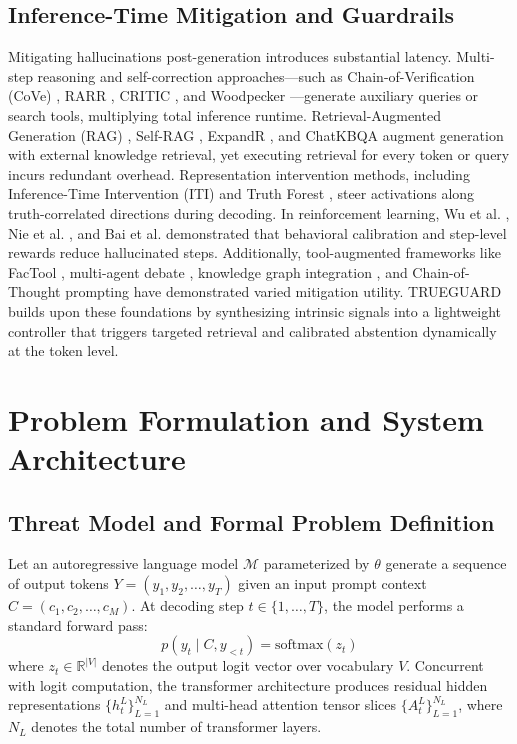 \documentclass[journal]{IEEEtran}
\begin{document}
\subsection{Inference-Time Mitigation and Guardrails}
Mitigating hallucinations post-generation introduces substantial latency. Multi-step reasoning and self-correction approaches---such as Chain-of-Verification (CoVe) \cite{dhuliawala2024chain}, RARR \cite{gao2023rarr}, CRITIC \cite{gou2023critic}, and Woodpecker \cite{yin2024woodpecker}---generate auxiliary queries or search tools, multiplying total inference runtime. Retrieval-Augmented Generation (RAG) \cite{lewis2020retrieval}, Self-RAG \cite{asai2023self}, ExpandR \cite{yao2025expandr}, and ChatKBQA \cite{luo2024chatkbqa} augment generation with external knowledge retrieval, yet executing retrieval for every token or query incurs redundant overhead. Representation intervention methods, including Inference-Time Intervention (ITI) \cite{li2023inference} and Truth Forest \cite{chen2024truth}, steer activations along truth-correlated directions during decoding. In reinforcement learning, Wu et al. \cite{wu2025behcal}, Nie et al. \cite{nie2026stop}, and Bai et al. \cite{bai2022training} demonstrated that behavioral calibration and step-level rewards reduce hallucinated steps. Additionally, tool-augmented frameworks like FacTool \cite{chern2023factool}, multi-agent debate \cite{du2024improving}, knowledge graph integration \cite{agrawal2024can}, and Chain-of-Thought prompting \cite{wei2022chainofthought} have demonstrated varied mitigation utility. TRUEGUARD builds upon these foundations by synthesizing intrinsic signals into a lightweight controller that triggers targeted retrieval and calibrated abstention dynamically at the token level.


\section{Problem Formulation and System Architecture}

\subsection{Threat Model and Formal Problem Definition}
Let an autoregressive language model $\mathcal{M}$ parameterized by $\theta$ generate a sequence of output tokens $Y = (y_1, y_2, \dots, y_T)$ given an input prompt context $C = (c_1, c_2, \dots, c_M)$. At decoding step $t \in \{1, \dots, T\}$, the model performs a standard forward pass:
\begin{equation}
    p(y_t \mid C, y_{<t}) = \text{softmax}(z_t)
\end{equation}
where $z_t \in \mathbb{R}^{|V|}$ denotes the output logit vector over vocabulary $V$. Concurrent with logit computation, the transformer architecture produces residual hidden representations $\{h_t^L\}_{L=1}^{N_L}$ and multi-head attention tensor slices $\{A_t^L\}_{L=1}^{N_L}$, where $N_L$ denotes the total number of transformer layers.
\end{document}
